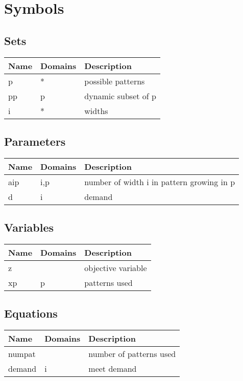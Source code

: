\documentclass[11pt]{article}
\begin{document}
\section*{Symbols}


\subsection*{Sets}
\begin{tabularx}{\textwidth}{| l | l | X |}
\hline
\textbf{Name} & \textbf{Domains} & \textbf{Description}\\
\hline
\endhead

p & * & possible patterns\\
pp & p & dynamic subset of p\\
i & * & widths\\
\hline
\end{tabularx}
\subsection*{Parameters}
\begin{tabularx}{\textwidth}{| l | l | X |}
\hline
\textbf{Name} & \textbf{Domains} & \textbf{Description}\\
\hline
\endhead

aip & i,p & number of width i in pattern growing in p\\
d & i & demand\\
\hline
\end{tabularx}
\subsection*{Variables}
\begin{tabularx}{\textwidth}{| l | l | X |}
\hline
\textbf{Name} & \textbf{Domains} & \textbf{Description}\\
\hline
\endhead

z &  & objective variable\\
xp & p & patterns used\\
\hline
\end{tabularx}
\subsection*{Equations}
\begin{tabularx}{\textwidth}{| l | l | X |}
\hline
\textbf{Name} & \textbf{Domains} & \textbf{Description}\\
\hline
\endhead

numpat &  & number of patterns used\\
demand & i & meet demand\\
\hline
\end{tabularx}
\end{document}
